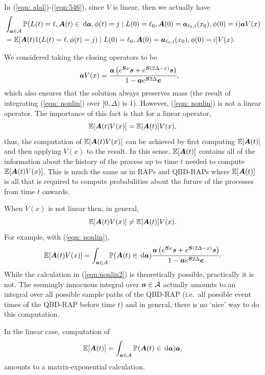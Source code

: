 In (\ref{eqn: alal})-(\ref{eqn:546}), since \(V\) is linear, then we actually have 
\begin{align}
	&\int_{\boldsymbol a \in\mathcal A}\mathbb P(L(t) = \ell, \boldsymbol A(t)\in\, \mathrm{d} \boldsymbol a,\phi(t) = j\mid L(0)=\ell_0, \boldsymbol A(0) = \boldsymbol a_{\ell_0,i}(x_0), \phi(0) = i) \boldsymbol a V(x) \nonumber 
	\\&= \mathbb E[\boldsymbol A(t)1(L(t)=\ell, \phi(t)=j) \mid L(0)=\ell_0, \boldsymbol A(0) = \boldsymbol a_{\ell_0,i}(x_0), \phi(0) = i]V(x).
\end{align}

\begin{rem}
	We considered taking the closing operators to be 
	\begin{align}
		\boldsymbol a V(x) &= \cfrac{\boldsymbol a \left(e^{ \boldsymbol{S}x} \boldsymbol s + e^{ \boldsymbol{S}(2\Delta-x)} \boldsymbol s\right)}{1-\boldsymbol a e^{\boldsymbol S 2\Delta}\boldsymbol e},\label{eqn: nonlin}
	\end{align}
	which also ensures that the solution always preserves mass (the result of integrating (\ref{eqn: nonlin}) over \([0,\Delta)\) is 1). However, (\ref{eqn: nonlin}) is not a linear operator. The importance of this fact is that for a linear operator, 
	\[\mathbb E[\boldsymbol A(t) V(x)] = \mathbb E[\boldsymbol A(t)]V(x),\]
	thus, the computation of \(\mathbb E[\boldsymbol A(t) V(x)]\) can be achieved by first computing \(\mathbb E[\boldsymbol A(t)]\) and then applying \(V(x)\) to the result. In this sense, \(\mathbb E[\boldsymbol A(t)]\) contains all of the information about the history of the process up to time \(t\) needed to compute \(\mathbb E[\boldsymbol A(t) V(x)]\). This is much the same as in RAPs and QBD-RAPs where \(\mathbb E[\boldsymbol A(t)]\) is all that is required to compute probabilities about the future of the processes from time \(t\) onwards. 

	When \(V(x)\) is not linear then, in general, 
	\[\mathbb E[\boldsymbol A(t) V(x)] \neq \mathbb E[\boldsymbol A(t)]V(x).\]
	For example, with (\ref{eqn: nonlin}), 
	\begin{align}
		\mathbb E[\boldsymbol A(t) V(x)] = \int_{\boldsymbol a \in\mathcal A} \mathbb P(\boldsymbol A(t) \in \, \mathrm{d} \boldsymbol a) \cfrac{\boldsymbol a \left(e^{ \boldsymbol{S}x} \boldsymbol s + e^{ \boldsymbol{S}(2\Delta-x)} \boldsymbol s\right)}{1-\boldsymbol a e^{\boldsymbol S 2\Delta}\boldsymbol e}.\label{eqn:nonlin2}
	\end{align}
	While the calculation in (\ref{eqn:nonlin2}) is theoretically possible, practically it is not. The seemingly innocuous integral over \(\boldsymbol a \in\mathcal A\) actually amounts to an integral over all possible sample paths of the QBD-RAP (i.e.~all possible event times of the QBD-RAP before time \(t\)) and in general, there is no `nice' way to do this computation. 
	
	In the linear case, computation of
	\[\mathbb E[\boldsymbol A(t)] = \int_{\boldsymbol a\in\mathcal A} \mathbb P(\boldsymbol A(t) \in \, \mathrm{d} \boldsymbol a) \boldsymbol a,\]
	amounts to a matrix-exponential calculation. 
\end{rem}

